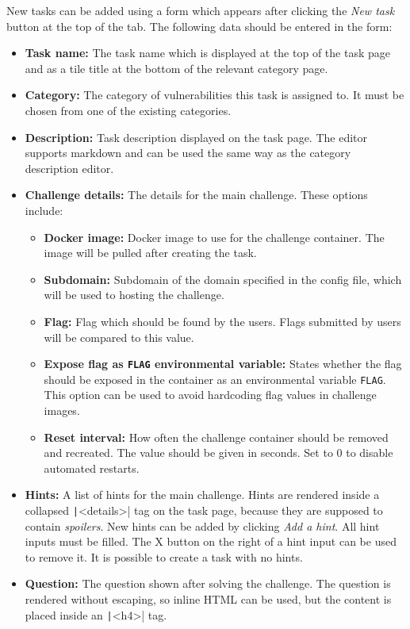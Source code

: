 New tasks can be added using a form which appears after clicking the \textit{New task} button at the top of the tab. The following data should be entered in the form:

\begin{itemize}
    \item \textbf{Task name:} The task name which is displayed at the top of the task page and as a tile title at the bottom of the relevant category page.
    \item \textbf{Category:} The category of vulnerabilities this task is assigned to. It must be chosen from one of the existing categories.
    \item \textbf{Description:} Task description displayed on the task page. The editor supports markdown and can be used the same way as the category description editor.
    \item \textbf{Challenge details:} The details for the main challenge. These options include:
    \begin{itemize}
        \item \textbf{Docker image:} Docker image to use for the challenge container. The image will be pulled after creating the task.
        \item \textbf{Subdomain:} Subdomain of the domain specified in the config file, which will be used to hosting the challenge.
        \item \textbf{Flag:} Flag which should be found by the users. Flags submitted by users will be compared to this value.
        \item \textbf{Expose flag as \texttt{FLAG} environmental variable:} States whether the flag should be exposed in the container as an environmental variable \texttt{FLAG}. This option can be used to avoid hardcoding flag values in challenge images.
        \item \textbf{Reset interval:} How often the challenge container should be removed and recreated. The value should be given in seconds. Set to 0 to disable automated restarts.
    \end{itemize}
    \item \textbf{Hints:} A list of hints for the main challenge. Hints are rendered inside a collapsed \texttt|<details>| tag on the task page, because they are supposed to contain \textit{spoilers}. New hints can be added by clicking \textit{Add a hint}. All hint inputs must be filled. The X button on the right of a hint input can be used to remove it. It is possible to create a task with no hints.
    \item \textbf{Question:} The question shown after solving the challenge. The question is rendered without escaping, so inline HTML can be used, but the content is placed inside an \texttt|<h4>| tag.

\end{itemize}
